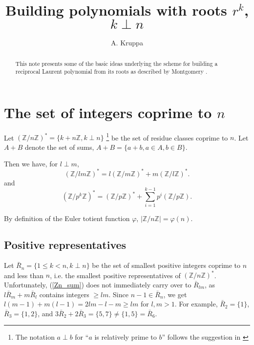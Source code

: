 \documentclass{article}
\begin{document}
\newcommand{\Z}{\mathbb{Z}}
\newcommand{\Zn}[1]{(\Z/{#1}\Z)^{*}}

\title{Building polynomials with roots $r^k$, $k\perp n$}
\author{A. Kruppa}
\maketitle


\begin{abstract}
This note presents some of the basic ideas underlying the scheme for building 
a reciprocal Laurent polynomial from its roots as described by Montgomery 
\cite{Montgomery2007}.
\end{abstract}


\section{The set of integers coprime to $n$}
Let $\Zn{n} = \{k + n\Z, k \perp n\}$
\footnote{The notation $a\perp b$ for ``$a$ is relatively prime to $b$''
          follows the suggestion in \cite[4.5]{Graham_Knuth_Patashnik}} 
be the set of residue classes coprime to $n$.
Let $A + B$ denote the set of sums, $A + B = \{a+b, a\in A, b\in B\}$.

Then we have, for $l \perp m$, 
\begin{equation}\label{Zn_sum}
\Zn{lm} = l\Zn{m} + m\Zn{l}.
\end{equation}
and
\begin{equation}
\Zn{p^k} =  \Zn{p} + \sum_{i=1}^{k-1} p^i (\Z/p\Z).
\end{equation}

By definition of the Euler totient function $\varphi$, $|\Z/n\Z| = \varphi(n)$.

\subsection{Positive representatives}
Let $\bar{R}_n = \{1 \leq k < n, k \perp n\}$ be the set of smallest 
positive integers coprime to $n$ and less than $n$, i.e. the smallest 
positive representatives of $\Zn{n}$. 
Unfortunately, (\ref{Zn_sum}) does not immediately carry over to 
$\bar{R}_{lm}$, as $l\bar{R}_m + m\bar{R}_l$ contains integers $\geq lm$.
Since $n-1 \in \bar{R}_n$, we get
$l(m-1) + m(l-1) = 2lm-l-m \geq lm$ for $l,m > 1$. For example, 
$\bar{R}_2 = \{1\}$, $\bar{R}_3 = \{1,2\}$, and 
$3\bar{R}_2 + 2\bar{R}_3 = \{5, 7\} \neq \{1, 5\} = \bar{R}_6$.

\end{document}
